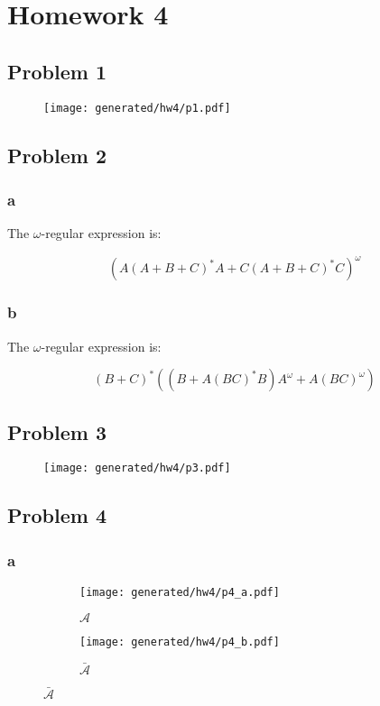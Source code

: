 \chapter{Homework 4}

\section{Problem 1}

\begin{figure}[H]
    \centering
    \texttt{[image: generated/hw4/p1.pdf]}
\end{figure}

\section{Problem 2}

\subsection{a}

The $\omega$-regular expression is:

$$
(A (A + B + C)^* A + C (A + B + C)^* C)^{\omega}
$$

\subsection{b}

The $\omega$-regular expression is:

$$
(B + C)^*((B + A(BC)^*B)A^{\omega} + A(BC)^{\omega})
$$

\section{Problem 3}

\begin{figure}[H]
    \centering
    \texttt{[image: generated/hw4/p3.pdf]}
\end{figure}

\section{Problem 4}

\subsection{a}

\begin{figure}[H]
    \centering
    \begin{subfigure}[b]{0.45\textwidth}
        \centering
        \texttt{[image: generated/hw4/p4\_a.pdf]}
        \caption{$\mathcal{A}$}
    \end{subfigure}
    \hfill
    \begin{subfigure}[b]{0.45\textwidth}
        \centering
        \texttt{[image: generated/hw4/p4\_b.pdf]}
        \caption{$\bar{\mathcal{A}}$}
    \end{subfigure}
\end{figure}

